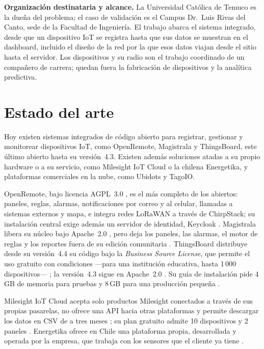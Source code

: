\textbf{Organización destinataria y alcance.} La Universidad Católica de Temuco es la dueña del
problema; el caso de validación es el Campus Dr.\ Luis Rivas del Canto, sede de la Facultad de
Ingeniería. El trabajo abarca el sistema integrado, desde que un dispositivo IoT se registra hasta que
sus datos se muestran en el dashboard, incluido el diseño de la red por la que esos datos viajan desde
el sitio hasta el servidor. Los dispositivos y su radio son el trabajo coordinado de un compañero de carrera; quedan fuera la fabricación de dispositivos y la analítica predictiva.

\section{Estado del arte}
\label{sec:estado-arte}

Hoy existen sistemas integrados de código abierto para registrar, gestionar y monitorear dispositivos
IoT, como OpenRemote, Magistrala y ThingsBoard, este último abierto hasta su versión~4.3.
Existen además soluciones atadas a su propio hardware o a su servicio, como Milesight IoT Cloud o la
chilena Energetika, y plataformas comerciales en la nube, como Ubidots y TagoIO.

OpenRemote, bajo licencia AGPL~3.0 \parencite{openremotelicencia}, es el más completo de los abiertos:
paneles, reglas, alarmas, notificaciones por correo y al celular, llamadas a sistemas externos y mapa,
e integra redes LoRaWAN a través de ChirpStack; su instalación central exige además un servidor de
identidad, Keycloak \parencite{openremotedocs}. Magistrala libera su núcleo bajo Apache~2.0
\parencite{magistralalicencia}, pero deja los paneles, las alarmas, el motor de reglas y los reportes
fuera de su edición comunitaria \parencite{magistraladocs}. ThingsBoard distribuye
desde su versión~4.4 su código bajo la \emph{Business Source License}, que permite el uso gratuito
con condiciones ---para una institución educativa, hasta 1\,000 dispositivos--- \parencite{thingsboardbusl};
la versión~4.3 sigue en Apache~2.0 \parencite{thingsboardlicencia43}. Su guía de instalación pide
4\,GB de memoria para pruebas y 8\,GB para una producción pequeña \parencite{thingsboardinstalacion}.

Milesight IoT Cloud acepta solo productos Milesight conectados a través de sus propias pasarelas, no
ofrece una API hacia otras plataformas y permite descargar los datos en CSV de a tres meses
\parencite{milesightfaq}; su plan gratuito admite 10 dispositivos y 2 paneles \parencite{milesightcloud}.
Energetika ofrece en Chile una plataforma propia, desarrollada y operada por la empresa, que trabaja
con los sensores que el cliente ya tiene \parencite{energetikaiotify}.

